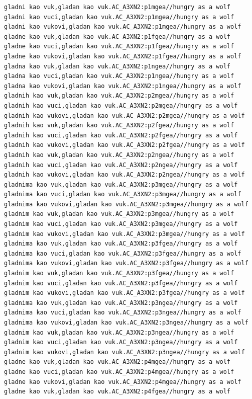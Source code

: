 \begin{verbatim}
gladni kao vuk,gladan kao vuk.AC_A3XN2:p1mgea//hungry as a wolf
gladni kao vuci,gladan kao vuk.AC_A3XN2:p1mgea//hungry as a wolf
gladni kao vukovi,gladan kao vuk.AC_A3XN2:p1mgea//hungry as a wolf
gladne kao vuk,gladan kao vuk.AC_A3XN2:p1fgea//hungry as a wolf
gladne kao vuci,gladan kao vuk.AC_A3XN2:p1fgea//hungry as a wolf
gladne kao vukovi,gladan kao vuk.AC_A3XN2:p1fgea//hungry as a wolf
gladna kao vuk,gladan kao vuk.AC_A3XN2:p1ngea//hungry as a wolf
gladna kao vuci,gladan kao vuk.AC_A3XN2:p1ngea//hungry as a wolf
gladna kao vukovi,gladan kao vuk.AC_A3XN2:p1ngea//hungry as a wolf
gladnih kao vuk,gladan kao vuk.AC_A3XN2:p2mgea//hungry as a wolf
gladnih kao vuci,gladan kao vuk.AC_A3XN2:p2mgea//hungry as a wolf
gladnih kao vukovi,gladan kao vuk.AC_A3XN2:p2mgea//hungry as a wolf
gladnih kao vuk,gladan kao vuk.AC_A3XN2:p2fgea//hungry as a wolf
gladnih kao vuci,gladan kao vuk.AC_A3XN2:p2fgea//hungry as a wolf
gladnih kao vukovi,gladan kao vuk.AC_A3XN2:p2fgea//hungry as a wolf
gladnih kao vuk,gladan kao vuk.AC_A3XN2:p2ngea//hungry as a wolf
gladnih kao vuci,gladan kao vuk.AC_A3XN2:p2ngea//hungry as a wolf
gladnih kao vukovi,gladan kao vuk.AC_A3XN2:p2ngea//hungry as a wolf
gladnima kao vuk,gladan kao vuk.AC_A3XN2:p3mgea//hungry as a wolf
gladnima kao vuci,gladan kao vuk.AC_A3XN2:p3mgea//hungry as a wolf
gladnima kao vukovi,gladan kao vuk.AC_A3XN2:p3mgea//hungry as a wolf
gladnim kao vuk,gladan kao vuk.AC_A3XN2:p3mgea//hungry as a wolf
gladnim kao vuci,gladan kao vuk.AC_A3XN2:p3mgea//hungry as a wolf
gladnim kao vukovi,gladan kao vuk.AC_A3XN2:p3mgea//hungry as a wolf
gladnima kao vuk,gladan kao vuk.AC_A3XN2:p3fgea//hungry as a wolf
gladnima kao vuci,gladan kao vuk.AC_A3XN2:p3fgea//hungry as a wolf
gladnima kao vukovi,gladan kao vuk.AC_A3XN2:p3fgea//hungry as a wolf
gladnim kao vuk,gladan kao vuk.AC_A3XN2:p3fgea//hungry as a wolf
gladnim kao vuci,gladan kao vuk.AC_A3XN2:p3fgea//hungry as a wolf
gladnim kao vukovi,gladan kao vuk.AC_A3XN2:p3fgea//hungry as a wolf
gladnima kao vuk,gladan kao vuk.AC_A3XN2:p3ngea//hungry as a wolf 
gladnima kao vuci,gladan kao vuk.AC_A3XN2:p3ngea//hungry as a wolf
gladnima kao vukovi,gladan kao vuk.AC_A3XN2:p3ngea//hungry as a wolf
gladnim kao vuk,gladan kao vuk.AC_A3XN2:p3ngea//hungry as a wolf
gladnim kao vuci,gladan kao vuk.AC_A3XN2:p3ngea//hungry as a wolf
gladnim kao vukovi,gladan kao vuk.AC_A3XN2:p3ngea//hungry as a wolf
gladne kao vuk,gladan kao vuk.AC_A3XN2:p4mgea//hungry as a wolf
gladne kao vuci,gladan kao vuk.AC_A3XN2:p4mgea//hungry as a wolf
gladne kao vukovi,gladan kao vuk.AC_A3XN2:p4mgea//hungry as a wolf
gladne kao vuk,gladan kao vuk.AC_A3XN2:p4fgea//hungry as a wolf

\end{verbatim}
